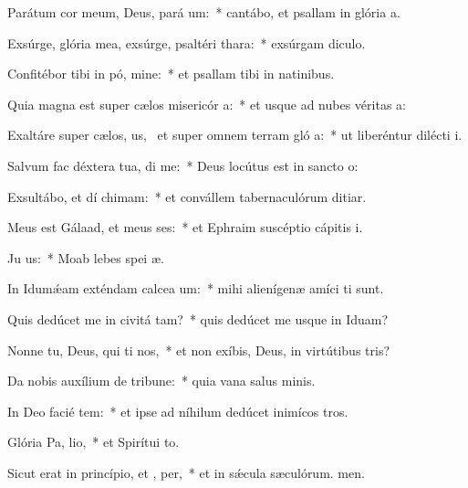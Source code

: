 \item Parátum cor meum, Deus, pará  um:~* cantábo, et psallam in glória a.
\item Exsúrge, glória mea, exsúrge, psaltéri  thara:~* exsúrgam diculo.
\item Confitébor tibi in pó, mine:~* et psallam tibi in natinibus.
\item Quia magna est super cælos misericór a:~* et usque ad nubes véritas a:
\item Exaltáre super cælos, us,~\pscross{} et super omnem terram gló a:~* ut liberéntur dilécti i.
\item Salvum fac déxtera tua,  di me:~* Deus locútus est in sancto o:
\item Exsultábo, et dí chimam:~* et convállem tabernaculórum ditiar.
\item Meus est Gálaad, et meus  ses:~* et Ephraim suscéptio cápitis i.
\item Ju  us:~* Moab lebes spei æ.
\item In Idumǽam exténdam calcea um:~* mihi alienígenæ amíci ti sunt.
\item Quis dedúcet me in civitá tam?~* quis dedúcet me usque in Iduam?
\item Nonne tu, Deus, qui ti nos,~* et non exíbis, Deus, in virtútibus tris?
\item Da nobis auxílium de tribune:~* quia vana salus minis.
\item In Deo facié tem:~* et ipse ad níhilum dedúcet inimícos tros.
\item Glória Pa,  lio,~* et Spirítui to.
\item Sicut erat in princípio, et ,  per,~* et in sǽcula sæculórum. men.
